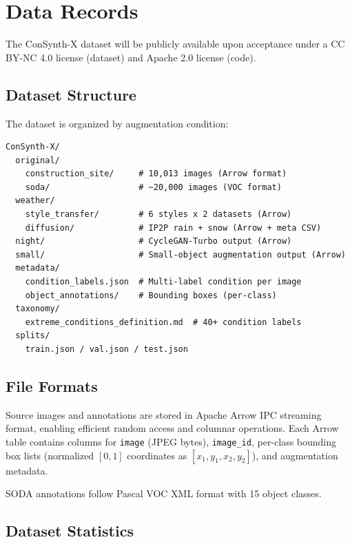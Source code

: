 \documentclass[12pt]{article}
\begin{document}
\section{Data Records}

The ConSynth-X dataset will be publicly available upon acceptance under a CC BY-NC 4.0 license (dataset) and Apache 2.0 license (code).

\subsection{Dataset Structure}

The dataset is organized by augmentation condition:

\begin{verbatim}
ConSynth-X/
  original/
    construction_site/     # 10,013 images (Arrow format)
    soda/                  # ~20,000 images (VOC format)
  weather/
    style_transfer/        # 6 styles x 2 datasets (Arrow)
    diffusion/             # IP2P rain + snow (Arrow + meta CSV)
  night/                   # CycleGAN-Turbo output (Arrow)
  small/                   # Small-object augmentation output (Arrow)
  metadata/
    condition_labels.json  # Multi-label condition per image
    object_annotations/    # Bounding boxes (per-class)
  taxonomy/
    extreme_conditions_definition.md  # 40+ condition labels
  splits/
    train.json / val.json / test.json
\end{verbatim}

\subsection{File Formats}

Source images and annotations are stored in Apache Arrow IPC streaming format, enabling efficient random access and columnar operations. Each Arrow table contains columns for \texttt{image} (JPEG bytes), \texttt{image\_id}, per-class bounding box lists (normalized $[0,1]$ coordinates as $[x_1, y_1, x_2, y_2]$), and augmentation metadata.

SODA annotations follow Pascal VOC XML format with 15 object classes.

\subsection{Dataset Statistics}
\end{document}
